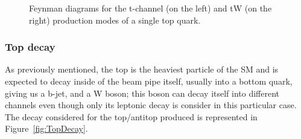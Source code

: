 \documentclass[a4paper, 10pt, openright]{report}
\begin{document}
\begin{figure}[htbp]
\centering
\begin{minipage}[b]{.34\textwidth}
\end{minipage} 
\begin{minipage}[b]{.34\textwidth}
\end{minipage} 
\caption{Feynman diagrams for the t-channel (on the left) and tW (on the right) production modes of a single top quark.}
\label{fig:singleTopOtherChann}
\end{figure}

\subsubsection{Top decay} \label{subsection:topDecay}

As previously mentioned, the top is the heaviest particle of the \ac{SM} and is expected to decay inside of the beam pipe itself, usually into a bottom quark, giving us a b-jet, and a W boson; this boson can decay itself into different channels even though only its leptonic decay is consider in this particular case. The decay considered for the top/antitop produced is represented in Figure~\ref{fig:TopDecay}.
\end{document}
